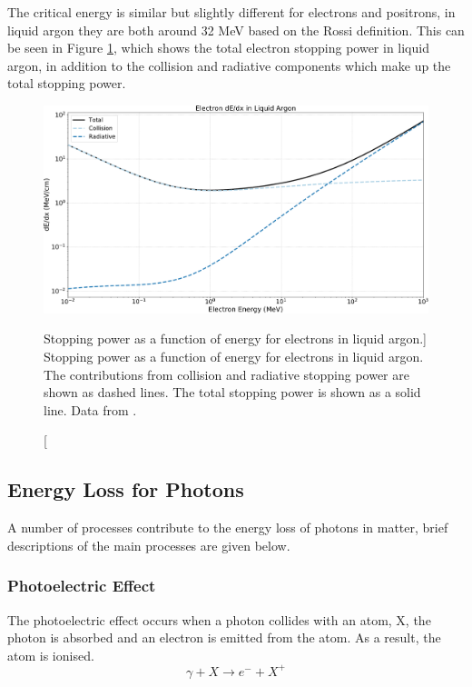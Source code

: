 The critical energy is similar but slightly different for electrons and 
positrons, in liquid argon they are both around 32 MeV based on the Rossi 
definition\cite{pdg_atomictables}. This can be seen in Figure 
\ref{fig:electron_dedx}, which shows the total electron stopping power in 
liquid argon, in addition to the collision and radiative components which make 
up the total stopping power. 

\begin{figure}

	\centering

	\includegraphics[width=\textwidth]{figures/electron_dedx_argon.pdf}

	\caption
	[Stopping power as a function of energy for electrons in liquid argon.]
	{Stopping power as a function of energy for electrons in liquid argon. The
	contributions from collision and radiative stopping power are shown as dashed
	lines. The total stopping power is shown as a solid line. Data from 
	\cite{estar}.}

	\label{fig:electron_dedx}

\end{figure}

\subsection{Energy Loss for Photons}
A number of processes contribute to the energy loss of photons in matter, brief 
descriptions of the main processes are given below.

\subsubsection*{Photoelectric Effect}
The photoelectric effect occurs when a photon collides with an atom, X, the
photon is absorbed and an electron is emitted from the atom. As a result, the 
atom is ionised. 
\begin{equation*}
	\gamma + X \rightarrow e^- + X^+
\end{equation*}

